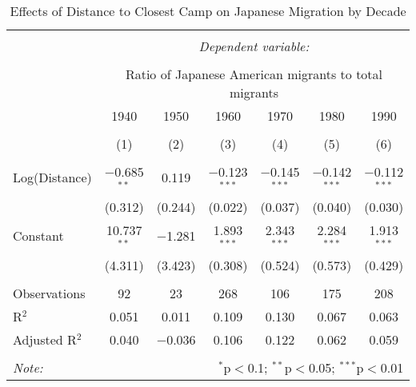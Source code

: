
\begin{table}[!htbp] \centering 
  \caption{Effects of Distance to Closest Camp on Japanese Migration by Decade} 
  \label{} 
\begin{tabular}{@{\extracolsep{5pt}}lcccccc} 
\\[-1.8ex]\hline 
\hline \\[-1.8ex] 
 & \multicolumn{6}{c}{\textit{Dependent variable:}} \\ 
\cline{2-7} 
\\[-1.8ex] & \multicolumn{6}{c}{Ratio of Japanese American migrants to total migrants} \\ 
 & 1940 & 1950 & 1960 & 1970 & 1980 & 1990 \\ 
\\[-1.8ex] & (1) & (2) & (3) & (4) & (5) & (6)\\ 
\hline \\[-1.8ex] 
 Log(Distance) & $-$0.685$^{**}$ & 0.119 & $-$0.123$^{***}$ & $-$0.145$^{***}$ & $-$0.142$^{***}$ & $-$0.112$^{***}$ \\ 
  & (0.312) & (0.244) & (0.022) & (0.037) & (0.040) & (0.030) \\ 
  Constant & 10.737$^{**}$ & $-$1.281 & 1.893$^{***}$ & 2.343$^{***}$ & 2.284$^{***}$ & 1.913$^{***}$ \\ 
  & (4.311) & (3.423) & (0.308) & (0.524) & (0.573) & (0.429) \\ 
 \hline \\[-1.8ex] 
Observations & 92 & 23 & 268 & 106 & 175 & 208 \\ 
R$^{2}$ & 0.051 & 0.011 & 0.109 & 0.130 & 0.067 & 0.063 \\ 
Adjusted R$^{2}$ & 0.040 & $-$0.036 & 0.106 & 0.122 & 0.062 & 0.059 \\ 
\hline 
\hline \\[-1.8ex] 
\textit{Note:}  & \multicolumn{6}{r}{$^{*}$p$<$0.1; $^{**}$p$<$0.05; $^{***}$p$<$0.01} \\ 
\end{tabular} 
\end{table} 
